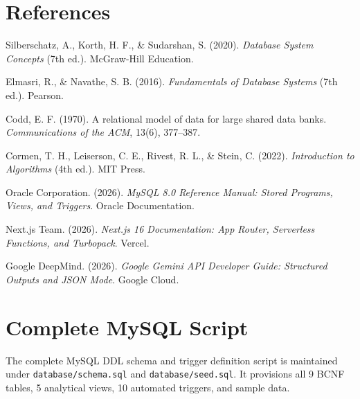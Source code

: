 \documentclass[12pt,a4paper]{report}
\DeclareRobustCommand{\_}{\textunderscore\allowbreak}
\begin{document}
\chapter*{References}

\begin{enumerate}[label={[\arabic*]}]
    \item Silberschatz, A., Korth, H. F., \& Sudarshan, S. (2020). \textit{Database System Concepts} (7th ed.). McGraw-Hill Education.
    \item Elmasri, R., \& Navathe, S. B. (2016). \textit{Fundamentals of Database Systems} (7th ed.). Pearson.
    \item Codd, E. F. (1970). A relational model of data for large shared data banks. \textit{Communications of the ACM}, 13(6), 377--387.
    \item Cormen, T. H., Leiserson, C. E., Rivest, R. L., \& Stein, C. (2022). \textit{Introduction to Algorithms} (4th ed.). MIT Press.
    \item Oracle Corporation. (2026). \textit{MySQL 8.0 Reference Manual: Stored Programs, Views, and Triggers}. Oracle Documentation.
    \item Next.js Team. (2026). \textit{Next.js 16 Documentation: App Router, Serverless Functions, and Turbopack}. Vercel.
    \item Google DeepMind. (2026). \textit{Google Gemini API Developer Guide: Structured Outputs and JSON Mode}. Google Cloud.
\end{enumerate}

\appendix

\chapter{Complete MySQL Script}
The complete MySQL DDL schema and trigger definition script is maintained under \texttt{database/schema.sql} and \texttt{database/seed.sql}. It provisions all 9 BCNF tables, 5 analytical views, 10 automated triggers, and sample data.
\end{document}
